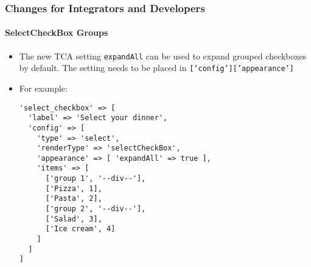 %

\begin{frame}[fragile]
	\frametitle{Changes for Integrators and Developers}
	\framesubtitle{SelectCheckBox Groups}

	\lstset{basicstyle=\tiny\ttfamily}

	\begin{itemize}
		\item The new TCA setting \texttt{expandAll} can be used to expand
			grouped checkboxes by default. The setting needs to be placed in\newline
			\smaller\texttt{['config']['appearance']}\normalsize
		\item For example:
\begin{lstlisting}
'select_checkbox' => [
  'label' => 'Select your dinner',
  'config' => [
    'type' => 'select',
    'renderType' => 'selectCheckBox',
    'appearance' => [ 'expandAll' => true ],
    'items' => [
      ['group 1', '--div--'],
      ['Pizza', 1],
      ['Pasta', 2],
      ['group 2', '--div--'],
      ['Salad', 3],
      ['Ice cream', 4]
    ]
  ]
]
\end{lstlisting}

	\end{itemize}

\end{frame}

